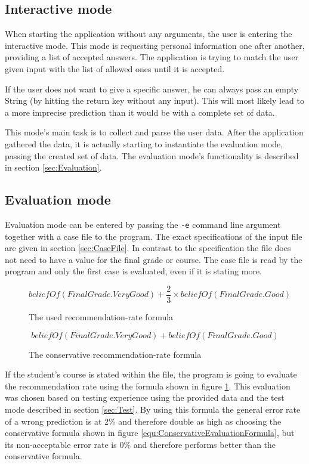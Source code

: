 \documentclass[%
	pdftex,
	oneside,        %
	11pt,           %
	parskip=half,   %
	headsepline,    %
	footsepline,    %
	abstracton,     %
	USenglish,      %
	a4paper,        %
]{report}
\begin{document}
\subsection{Interactive mode}
\label{sec:Interactive}
When starting the application without any arguments, the user is entering the interactive mode. This mode is requesting personal information one after another, providing a list of accepted answers. The application is trying to match the user given input with the list of allowed ones until it is accepted.

If the user does not want to give a specific answer, he can always pass an empty String (by hitting the return key without any input). This will most likely lead to a more imprecise prediction than it would be with a complete set of data.

This mode's main task is to collect and parse the user data. After the application gathered the data, it is actually starting to instantiate the evaluation mode, passing the created set of data. The evaluation mode's functionality is described in section \vref{sec:Evaluation}.

\subsection{Evaluation mode}
\label{sec:Evaluation}
Evaluation mode can be entered by passing the \texttt{-e} command line argument together with a case file to the program. The exact specifications of the input file are given in section \vref{sec:CaseFile}. In contrast to the specification the file does not need to have a value for the final grade or course. The case file is read by the program and only the first case is evaluated, even if it is stating more.

\begin{figure}
    \[ beliefOf(FinalGrade.VeryGood) + \frac{2}{3} \times beliefOf(FinalGrade.Good) \]
    \caption{The used recommendation-rate formula}
    \label{equ:EvaluationFormula}
\end{figure}

\begin{figure}
    \[ beliefOf(FinalGrade.VeryGood) + beliefOf(FinalGrade.Good) \]
    \caption{The conservative recommendation-rate formula}
    \label{equ:ConservativeEvaluationFormula}
\end{figure}

If the student's course is stated within the file, the program is going to evaluate the recommendation rate using the formula shown in figure \ref{equ:EvaluationFormula}. This evaluation was chosen based on testing experience using the provided data and the test mode described in section \vref{sec:Test}. By using this formula the general error rate of a wrong prediction is at 2\% and therefore double as high as choosing the conservative formula shown in figure \vref{equ:ConservativeEvaluationFormula}, but its non-acceptable error rate is 0\% and therefore performs better than the conservative formula.
\end{document}
